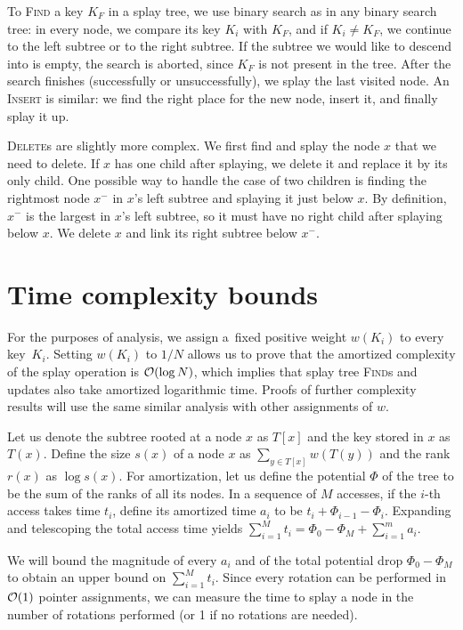 
To \textsc{Find} a key $K_F$ in a splay tree, we use binary search as in any
binary search tree: in every node, we compare its key $K_i$ with $K_F$, and
if $K_i \neq K_F$, we continue to the left subtree or to the right subtree.
If the subtree we would like to descend into is empty, the search is aborted,
since $K_F$ is not present in the tree.
After the search finishes (successfully or unsuccessfully), we splay the last
visited node. An \textsc{Insert} is similar: we find the right place for the
new node, insert it, and finally splay it up.

\textsc{Delete}s are slightly more complex. We first find and splay the node $x$
that we need to delete. If $x$ has one child after splaying, we delete it and
replace it by its only child. One possible way to handle the case of two
children is finding the rightmost node $x^-$ in $x$'s left subtree and splaying
it just below $x$. By definition, $x^-$ is the largest in $x$'s left subtree,
so it must have no right child after splaying below $x$. We delete $x$ and link
its right subtree below $x^-$.

\section{Time complexity bounds}
For the purposes of analysis, we assign a~fixed positive weight $w(K_i)$
to every key~$K_i$. Setting $w(K_i)$ to $1/N$ allows us to prove that
the amortized complexity of the splay operation is $\mathcal{O}(\log N)$, which implies
that splay tree \textsc{Find}s and updates also take amortized logarithmic time.
Proofs of further complexity results will use the same similar analysis with
other assignments of $w$.

Let us denote the subtree rooted at a node $x$ as $T[x]$
and the key stored in $x$ as $T(x)$. Define the size $s(x)$ of a node $x$ as
$\sum_{y\in T[x]} w(T(y))$ and the rank $r(x)$ as $\log s(x)$.
For amortization, let us define the potential $\Phi$ of the tree to be the sum
of the ranks of all its nodes. In a sequence of $M$ accesses, if the $i$-th
access takes time $t_i$, define its amortized time $a_i$ to be
$t_i+\Phi_{i-1}-\Phi_{i}$. Expanding and telescoping the total access time
yields $\sum_{i=1}^M t_i=\Phi_0-\Phi_M+\sum_{i=1}^m a_i$.

We will bound the magnitude of every $a_i$ and of the total potential drop
$\Phi_0-\Phi_M$ to obtain an upper bound on $\sum_{i=1}^M t_i$.
Since every rotation can be performed in $\mathcal{O}(1)$
pointer assignments, we can measure the time to splay a node in the number
of rotations performed (or 1 if no rotations are needed).

